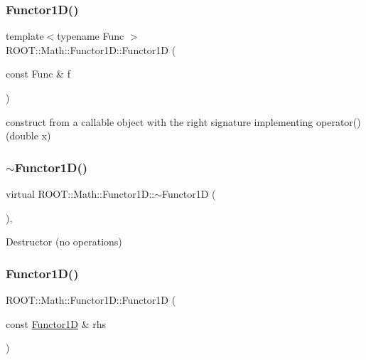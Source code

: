\subsubsection{\texorpdfstring{Functor1D()}{Functor1D()}\hspace{0.1cm}{\footnotesize\ttfamily [7/8]}}
{\footnotesize\ttfamily template$<$typename Func $>$ \\
R\+O\+O\+T\+::\+Math\+::\+Functor1\+D\+::\+Functor1D (\begin{DoxyParamCaption}\item[{const Func \&}]{f }\end{DoxyParamCaption})\hspace{0.3cm}{\ttfamily [inline]}}

construct from a callable object with the right signature implementing operator() (double x) \mbox{\label{classROOT_1_1Math_1_1Functor1D_a270ac3bfa816f778226caad0e6731a5f}} 
\subsubsection{\texorpdfstring{$\sim$Functor1D()}{~Functor1D()}\hspace{0.1cm}{\footnotesize\ttfamily [2/2]}}
{\footnotesize\ttfamily virtual R\+O\+O\+T\+::\+Math\+::\+Functor1\+D\+::$\sim$\+Functor1D (\begin{DoxyParamCaption}{ }\end{DoxyParamCaption})\hspace{0.3cm}{\ttfamily [inline]}, {\ttfamily [virtual]}}

Destructor (no operations) \mbox{\label{classROOT_1_1Math_1_1Functor1D_a3323053da6385e3168b80163b266c600}} 
\subsubsection{\texorpdfstring{Functor1D()}{Functor1D()}\hspace{0.1cm}{\footnotesize\ttfamily [8/8]}}
{\footnotesize\ttfamily R\+O\+O\+T\+::\+Math\+::\+Functor1\+D\+::\+Functor1D (\begin{DoxyParamCaption}\item[{const \mbox{\hyperlink{classROOT_1_1Math_1_1Functor1D}{Functor1D}} \&}]{rhs }\end{DoxyParamCaption})\hspace{0.3cm}{\ttfamily [inline]}}

